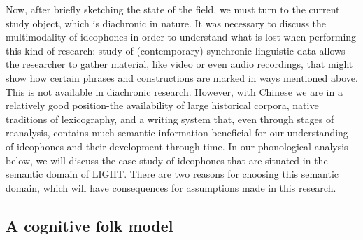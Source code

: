 Now, after briefly sketching the state of the field, we must turn to the
current study object, which is diachronic in nature. It was necessary to
discuss the multimodality of ideophones in order to understand what is
lost when performing this kind of research: study of (contemporary)
synchronic linguistic data allows the researcher to gather material,
like video or even audio recordings, that might show how certain phrases
and constructions are marked in ways mentioned above. This is not
available in diachronic research. However, with Chinese we are in a
relatively good position-the availability of large historical corpora,
native traditions of lexicography, and a writing system that, even
through stages of reanalysis, contains much semantic information
beneficial for our understanding of ideophones and their development
through time. In our phonological analysis below, we will discuss the
case study of ideophones that are situated in the semantic domain of
LIGHT. There are two reasons for choosing this semantic domain, which
will have consequences for assumptions made in this research.

\subsection{A cognitive folk model}\label{a-cognitive-folk-model}

